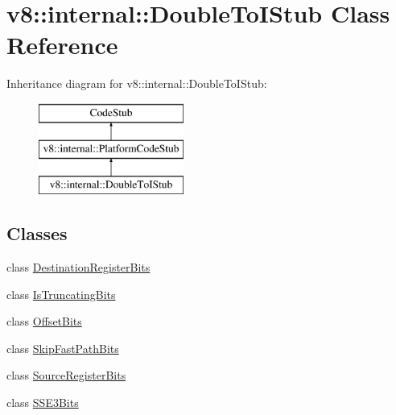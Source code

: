 \hypertarget{classv8_1_1internal_1_1_double_to_i_stub}{}\section{v8\+:\+:internal\+:\+:Double\+To\+I\+Stub Class Reference}
\label{classv8_1_1internal_1_1_double_to_i_stub}
Inheritance diagram for v8\+:\+:internal\+:\+:Double\+To\+I\+Stub\+:\begin{figure}[H]
\begin{center}
\leavevmode
\includegraphics[height=3.000000cm]{classv8_1_1internal_1_1_double_to_i_stub}
\end{center}
\end{figure}
\subsection*{Classes}
\begin{DoxyCompactItemize}
\item 
class \hyperlink{classv8_1_1internal_1_1_double_to_i_stub_1_1_destination_register_bits}{Destination\+Register\+Bits}
\item 
class \hyperlink{classv8_1_1internal_1_1_double_to_i_stub_1_1_is_truncating_bits}{Is\+Truncating\+Bits}
\item 
class \hyperlink{classv8_1_1internal_1_1_double_to_i_stub_1_1_offset_bits}{Offset\+Bits}
\item 
class \hyperlink{classv8_1_1internal_1_1_double_to_i_stub_1_1_skip_fast_path_bits}{Skip\+Fast\+Path\+Bits}
\item 
class \hyperlink{classv8_1_1internal_1_1_double_to_i_stub_1_1_source_register_bits}{Source\+Register\+Bits}
\item 
class \hyperlink{classv8_1_1internal_1_1_double_to_i_stub_1_1_s_s_e3_bits}{S\+S\+E3\+Bits}
\end{DoxyCompactItemize}
